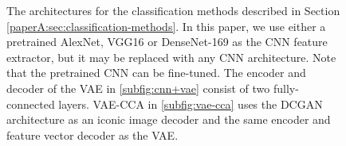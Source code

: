 \begin{figure}[t]
    \caption{The architectures for the classification methods described in Section \ref{paperA:sec:classification-methods}. In this paper, we use either a pretrained AlexNet, VGG16 or DenseNet-169 as the CNN feature extractor, but it may be replaced with any CNN architecture. Note that the pretrained CNN can be fine-tuned. The encoder and decoder of the VAE in \ref{subfig:cnn+vae} consist of two fully-connected layers. VAE-CCA in \ref{subfig:vae-cca} uses the DCGAN architecture as an iconic image decoder and the same encoder and feature vector decoder as the VAE.   }
    \label{fig:classification-methods}
\end{figure}

